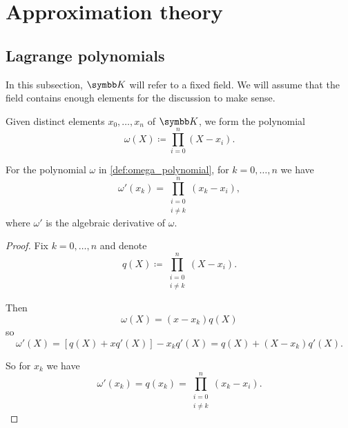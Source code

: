 \section{Approximation theory}\label{sec:approximation_theory}
\subsection{Lagrange polynomials}\label{subsec:lagrange_polynomials}

In this subsection, \( \BK \) will refer to a fixed field. We will assume that the field contains enough elements for the discussion to make sense.

\begin{definition}\label{def:omega_polynomial}
  Given distinct elements \( x_0, \ldots, x_n \) of \( \BK \), we form the polynomial
  \begin{equation*}
    \omega(X) \coloneqq \prod_{i=0}^n (X - x_i).
  \end{equation*}
\end{definition}

\begin{proposition}\label{def:omega_polynomial_derivative}
  For the polynomial \( \omega \) in \cref{def:omega_polynomial}, for \( k = 0, \ldots, n \) we have
  \begin{equation*}
    \omega'(x_k) = \prod_{\substack{i = 0 \\ i \neq k}}^n (x_k - x_i),
  \end{equation*}
  where \( \omega' \) is the algebraic derivative of \( \omega \).
\end{proposition}
\begin{proof}
  Fix \( k = 0, \ldots, n \) and denote
  \begin{equation*}
    q(X) \coloneqq \prod_{\substack{i = 0 \\ i \neq k}}^n (X - x_i).
  \end{equation*}

  Then
  \begin{equation*}
    \omega(X) = (x - x_k) q(X)
  \end{equation*}
  so
  \begin{equation*}
    \omega'(X) = [q(X) + x q'(X)] - x_k q'(X) = q(X) + (X - x_k) q'(X).
  \end{equation*}

  So for \( x_k \) we have
  \begin{equation*}
    \omega'(x_k) = q(x_k) = \prod_{\substack{i = 0 \\ i \neq k}}^n (x_k - x_i).
  \end{equation*}
\end{proof}

